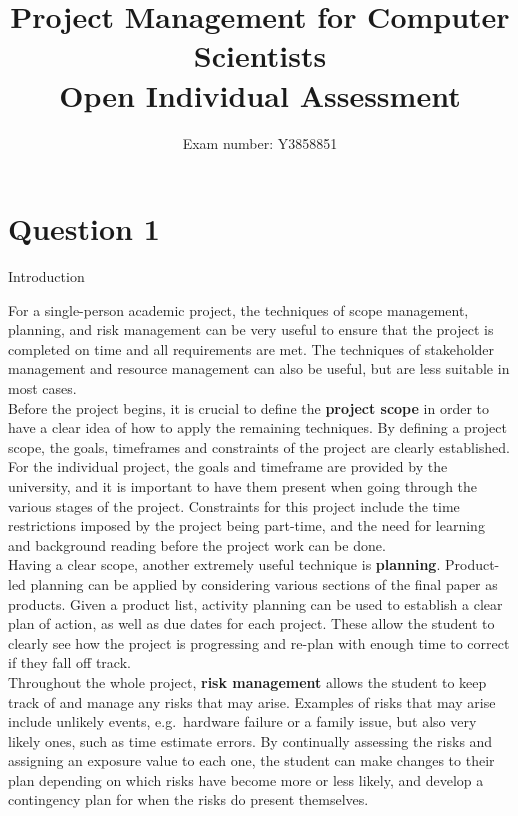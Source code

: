 \documentclass[12pt]{report}
\begin{document}
\author{Exam number: Y3858851}
\title{Project Management for Computer Scientists \\ {\large Open Individual Assessment}}
\date{}
\maketitle
\section*{Question 1} 

Introduction

For a single-person academic project, the techniques of scope management, planning, and risk management can be very useful to ensure that the project is completed on time and all requirements are met. The techniques of stakeholder management and resource management can also be useful, but are less suitable in most cases.\\ 

Before the project begins, it is crucial to define the \textbf{project scope} in order to have a clear idea of how to apply the remaining techniques. By defining a project scope, the goals, timeframes and constraints of the project are clearly established. For the individual project, the goals and timeframe are provided by the university, and it is important to have them present when going through the various stages of the project. Constraints for this project include the time restrictions imposed by the project being part-time, and the need for learning and background reading before the project work can be done.\\

Having a clear scope, another extremely useful technique is \textbf{planning}. Product-led planning can be applied by considering various sections of the final paper as products. Given a product list, activity planning can be used to establish a clear plan of action, as well as due dates for each project. These allow the student to clearly see how the project is progressing and re-plan with enough time to correct if they fall off track.\\

Throughout the whole project, \textbf{risk management} allows the student to keep track of and manage any risks that may arise. Examples of risks that may arise include unlikely events, e.g.\ hardware failure or a family issue, but also very likely ones, such as time estimate errors\cite{estimates}. By continually assessing the risks and assigning an exposure value to each one, the student can make changes to their plan depending on which risks have become more or less likely, and develop a contingency plan for when the risks do present themselves.\\
\end{document}
